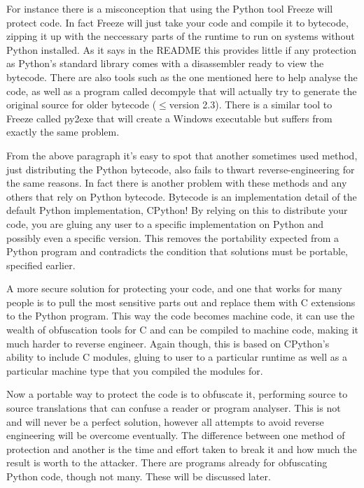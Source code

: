 \documentclass{report}
\begin{document}
For instance there is a misconception that using the Python tool Freeze will protect code. In fact Freeze will
just take your code and compile it to bytecode, zipping it up with the neccessary parts of the runtime to run
on systems without Python installed. As it says in the README\cite{freezereadme} this provides little if any
protection as Python's standard library comes with a disassembler ready to view the bytecode. There are also
tools such as the one mentioned here\cite{pirates} to help analyse the code, as well as a program called
decompyle\cite{decompyle} that will actually try to generate the original source for older bytecode ($\le$version
2.3). There is a similar tool to Freeze called py2exe\cite{py2exe} that will create a Windows executable but
suffers from exactly the same problem.

From the above paragraph it's easy to spot that another sometimes used method, just distributing the Python
bytecode, also fails to thwart reverse-engineering for the same reasons. In fact there is another problem
with these methods and any others that rely on Python bytecode. Bytecode is an implementation detail\cite{dis}
of the default Python implementation, CPython! By relying on this to distribute your code, you are gluing any
user to a specific implementation on Python and possibly even a specific version. This removes the portability
expected from a Python program and contradicts the condition that solutions must be portable, specified earlier.

A more secure solution for protecting your code, and one that works for many people is to pull the most
sensitive parts out and replace them with C extensions to the Python program. This way the code becomes machine
code, it can use the wealth of obfuscation tools for C and can be compiled to machine code, making it much
harder to reverse engineer. Again though, this is based on CPython's ability to include C modules, gluing to
user to a particular runtime as well as a particular machine type that you compiled the modules for.

Now a portable way to protect the code is to obfuscate it, performing source to source translations that can
confuse a reader or program analyser. This is not and will never be a perfect solution, however all attempts
to avoid reverse engineering will be overcome eventually. The difference between one method of protection and
another is the time and effort taken to break it and how much the result is worth to the attacker. There are
programs already for obfuscating Python code, though not many. These will be discussed later.
\end{document}
